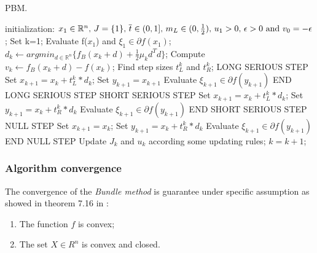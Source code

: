 \begin{algorithm}[H]
	\caption{PBM.}
	\label{alg:PBM}
	\begin{algorithmic}[4]
		\State initialization:
		\State $x_1 \in \mathbb{R}^n, \,  J=\{1\}, \, \overline{t} \in (0,1], \, m_{L} \in (0,\frac{1}{2}), \, u_1>0, \, \epsilon>0 \textnormal{ and } v_0= -\epsilon$;
		\State Set k=1;
		\State Evaluate f($x_1$) and $ \xi_1 \in \partial f (x_1)$;
		\Repeat
		\State $d_k\leftarrow argmin_{d\in \mathbb{R}^n }\{f_B(x_{k} + d) +\frac{1}{2}\mu_{k}d^{T}d\}$;
		\State Compute $v_{k} \leftarrow f_B(x_{k} + d) - f(x_k)$;
		\State Find step sizes $t^{k}_{L}$ and  $t^{k}_{R}$;
				\State LONG SERIOUS STEP
				\State Set $x_{k+1}= x_{k} + t^{k}_{L}*d_{k}$;
				\State Set $y_{k+1}= x_{k+1}$
				\State Evaluate $\xi_{k+1} \in \partial f (y_{k+1})$ 
				\State END LONG SERIOUS STEP
			\Else
				\State SHORT SERIOUS STEP
				\State Set $x_{k+1}= x_{k} + t^{k}_{L}*d_{k}$;
				\State Set $y_{k+1}= x_{k}+t^{k}_{R}*d_{k}$
				\State Evaluate $\xi_{k+1} \in \partial f (y_{k+1})$ 
				\State END SHORT SERIOUS STEP
			\EndIf
		\Else
			\State NULL STEP
			\State Set $x_{k+1}= x_{k}$;
			\State Set $y_{k+1}= x_{k}+t^{k}_{R}*d_{k}$
			\State Evaluate $\xi_{k+1} \in \partial f (y_{k+1})$ 
			\State END NULL STEP		
		\EndIf
		\State Update $J_{k}$ and $u_{k}$ according some updating rules;
		\State $k=k+1$;
		\EndProcedure 
	\end{algorithmic}
\end{algorithm}



\subsubsection{Algorithm convergence}
\label{PBM-Convergence}
The convergence of the \textit{Bundle method} is guarantee under specific assumption as showed in theorem 7.16 in \cite{NonOpt}:
\begin{enumerate} \label{convergence:assBM}
	\item The function $f$ is convex;
	\item The set $X \in R^n$ is convex and closed.
\end{enumerate}

